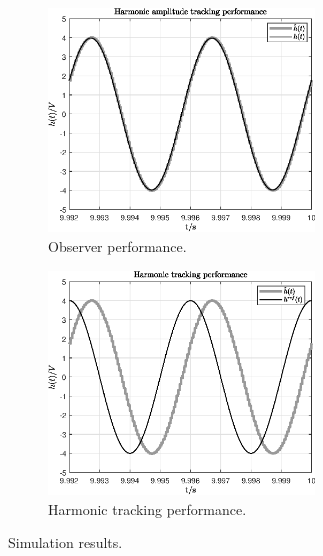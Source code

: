 \documentclass[11pt,a4paper,oneside]{book}
\numberwithin{equation}{section}
\theoremstyle{it}
\theoremstyle{definition}
\begin{document}
\begin{figure}[H]
	\centering
	\begin{subfigure}{.5\textwidth}
		\centering
		\includegraphics[width = 200pt, angle=0, 
		keepaspectratio]{figures/shaker/scalar/observer_performance.eps}
		\captionsetup{width=.5\textwidth}
		\caption{Observer performance.}
		\label{}
	\end{subfigure}%
	\begin{subfigure}{.5\textwidth}
		\centering
		\includegraphics[width = 200pt, angle=0, 
		keepaspectratio]{figures/shaker/scalar/harmonic_tracking.eps}
		\captionsetup{width=.5\textwidth}
		\caption{Harmonic tracking performance.}
		\label{}
	\end{subfigure}
	\caption{Simulation results.}
	\label{}
\end{figure}
\end{document}
